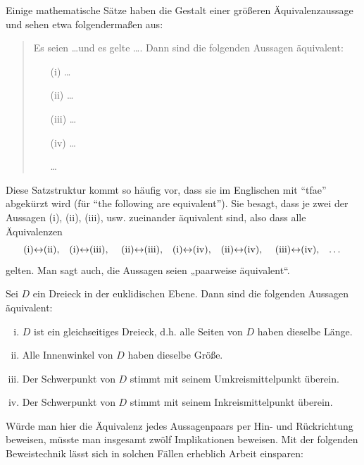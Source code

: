 \begin{defin} \label{def:tfae}
    Einige mathematische Sätze haben die Gestalt einer größeren Äquivalenzaussage und sehen etwa folgendermaßen aus:
    \begin{quote}
        Es seien \dots und es gelte \dots. Dann sind die folgenden Aussagen äquivalent:
        \begin{itemize}
            \item[(i)] \dots
            \item[(ii)] \dots
            \item[(iii)] \dots
            \item[(iv)] \dots
            \item[\dots]
        \end{itemize}
    \end{quote}
    Diese Satzstruktur kommt so häufig vor, dass sie im Englischen mit ``tfae'' abgekürzt wird (für ``the following are equivalent''). Sie besagt, dass je zwei der Aussagen (i), (ii), (iii), usw. zueinander äquivalent sind, also dass alle Äquivalenzen
        \[ \text{(i)$\leftrightarrow$(ii),\quad (i)$\leftrightarrow$(iii), \quad (ii)$\leftrightarrow$(iii),\quad (i)$\leftrightarrow$(iv),\quad (ii)$\leftrightarrow$(iv), \quad (iii)$\leftrightarrow$(iv),\quad \dots} \]
    gelten. Man sagt auch, die Aussagen seien „paarweise äquivalent“.
 \end{defin}
 
 
\begin{bsp}
    Sei $D$ ein Dreieck in der euklidischen Ebene. Dann sind die folgenden Aussagen äquivalent:
    \begin{enumerate}[(i)]
        \item $D$ ist ein gleichseitiges Dreieck, d.h. alle Seiten von $D$ haben dieselbe Länge.
        \item Alle Innenwinkel von $D$ haben dieselbe Größe.
        \item Der Schwerpunkt von $D$ stimmt mit seinem Umkreismittelpunkt überein.
        \item Der Schwerpunkt von $D$ stimmt mit seinem Inkreismittelpunkt überein.
    \end{enumerate}
Würde man hier die Äquivalenz jedes Aussagenpaars per Hin- und Rückrichtung beweisen, müsste man insgesamt zwölf Implikationen beweisen. Mit der folgenden Beweistechnik lässt sich in solchen Fällen erheblich Arbeit einsparen:
\end{bsp}


